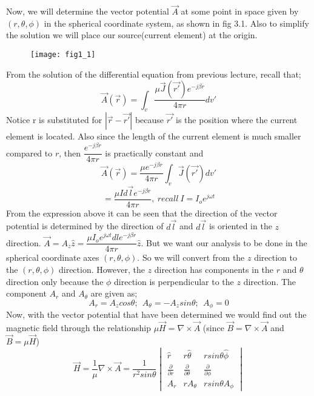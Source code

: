 	Now, we will determine the vector potential $\vec{A}$ at some point in space given by $(r, \theta, \phi)$ in the spherical coordinate system, as shown in fig 3.1. Also to simplify the solution we will place our source(current element) at the origin.
		\begin{figure}[h]
		\texttt{[image: fig1\_1]}
		\centering
		\caption{}
		\label{fig:1}
	\end{figure}\newline
	From the solution of the differential equation from previous lecture, recall that;
	$$ \vec{A}(\vec{r}) =\int_v \dfrac{\mu \vec{J}(\vec{r'}) e^{-j\beta r}}{4\pi r}dv'$$ 
	Notice r is substituted for $|\vec{r} - \vec{r'}|$ because $\vec{r'}$ is the position where the current element is located. Also since the length of the current element is much smaller compared to $r$, then $\dfrac{e^{-j\beta r}}{4 \pi r}$ is practically constant and 
	$$ \vec{A}(\vec{r}) = \dfrac{\mu e^{-j\beta r}}{4 \pi r}\int_v\vec{J}(\vec{r'})dv'$$
	$$  = \dfrac{\mu I d\vec{l} e^{-j\beta r}}{4\pi r}, \ recall \ I = I_oe^{j\omega t}$$
	From the expression above it can be seen that the direction of the vector potential is determined by the direction of $d\vec{l}$ and $d\vec{l}$ is oriented in the $z$ direction. $\vec{A} = A_z\hat{z} = \dfrac{\mu I_o e^{j\omega t} dl e^{-j\beta r}}{4\pi r}\hat{z}$. But we want our analysis to be done in the spherical coordinate axes $(r, \theta, \phi)$. So we will convert from the $z$ direction to the $(r, \theta, \phi)$ direction. However, the $z$ direction has components in the $r$ and $\theta$ direction only because the $\phi$ direction is perpendicular to the $z$ direction. The component $A_{r}$ and $A_{\theta}$ are given as;
	$$ A_{r} = A_z cos\theta; \ \
	A_{\theta} = - A_z sin\theta; \ \
	A_{\phi} = 0 $$
	Now, with the vector potential that have been determined we would find out the magnetic field through the relationship $\mu \vec{H} = \nabla \times \vec{A}$ (since $\vec{B} = \nabla \times \vec{A}$ and $ \vec{B} = \mu \vec{H}$)
	\begin{equation*}
	\vec{H} = \frac{1}{\mu} \nabla \times \vec{A} = \dfrac{1}{r^2 sin\theta}\begin{vmatrix}
	\hat{r} & r\hat{\theta} & rsin\theta\hat{\phi} \\
	\frac{\partial }{\partial r} &  \frac{\partial }{\partial \theta} &  \frac{\partial }{\partial \phi} \\
	A_r & rA_{\theta} & rsin\theta A_{\phi}
	\end{vmatrix}
	\end{equation*}

